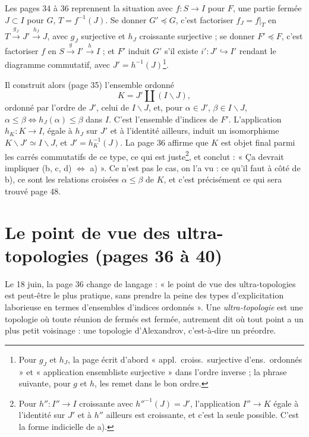 \documentclass[11pt,a4paper]{article}
\begin{document}
Les pages 34 à 36 reprennent la situation avec $f : S \to I$ pour $F$, une
partie fermée $J \subset I$ pour $G$, $T = f^{-1}(J)$. Se donner $G'
\preccurlyeq G$, c'est factoriser $f_{J} = f|_{T}$ en $T \xrightarrow{g_{J}} J'
\xrightarrow{h_{J}} J$, avec $g_{J}$ surjective et $h_{J}$ croissante
surjective ; se donner $F' \preccurlyeq F$, c'est factoriser $f$ en $S
\xrightarrow{g} I' \xrightarrow{h} I$ ; et $F'$ induit $G'$ s'il existe $i' : J'
\hookrightarrow I'$ rendant le diagramme commutatif, avec $J' =
h^{-1}(J)$\footnote{Pour $g_{J}$ et $h_{J}$, la page écrit d'abord « appl.\
croiss.\ surjective d'ens.\ ordonnés » et « application ensembliste surjective »
dans l'ordre inverse ; la phrase suivante, pour $g$ et $h$, les remet dans le
bon ordre.}.

Il construit alors (page 35) l'ensemble ordonné
\[
K = J' \amalg (I \smallsetminus J),
\]
ordonné par l'ordre de $J'$, celui de $I \smallsetminus J$, et, pour $\alpha \in
J'$, $\beta \in I \smallsetminus J$, $\alpha \leq \beta \iff h_{J}(\alpha) \leq
\beta$ dans $I$. C'est l'ensemble d'indices de $F'$. L'application $h_{K} :
K \to I$, égale à $h_{J}$ sur $J'$ et à l'identité ailleurs, induit un
isomorphisme $K \smallsetminus J' \simeq I \smallsetminus J$, et $J' =
h_{K}^{-1}(J)$. La page 36 affirme que $K$ est objet final parmi les carrés
commutatifs de ce type, ce qui est juste\footnote{Pour $h'' : I'' \to I$
croissante avec $h''^{-1}(J) = J'$, l'application $I'' \to K$ égale à l'identité
sur $J'$ et à $h''$ ailleurs est croissante, et c'est la seule possible. C'est
la forme indicielle de a).}, et conclut : « Ça devrait impliquer (b, c, d)
$\Leftrightarrow$ a) ». Ce n'est pas le cas, on l'a vu : ce qu'il faut à côté de
b), ce sont les relations croisées $\alpha \leq \beta$ de $K$, et c'est
précisément ce qui sera trouvé page 48.

\section*{Le point de vue des ultra-topologies (pages 36 à 40)}

Le 18 juin, la page 36 change de langage : « le point de vue des
ultra-topologies est peut-être le plus pratique, sans prendre la peine des
types d'explicitation laborieuse en termes d'ensembles d'indices ordonnés ».
Une \emph{ultra-topologie} est une topologie où toute réunion de fermés est
fermée, autrement dit où tout point a un plus petit voisinage : une topologie
d'Alexandrov, c'est-à-dire un préordre.
\end{document}
